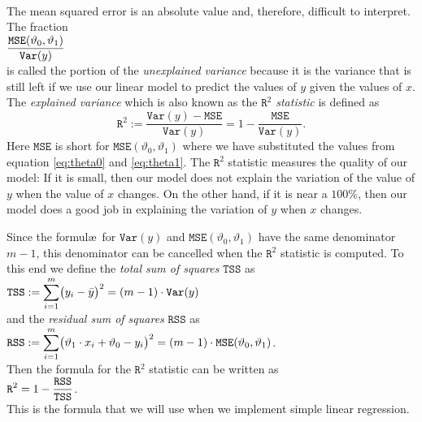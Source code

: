 \\[0.2cm]
The mean squared error is an absolute value and, therefore, difficult to interpret.  The fraction
\\[0.2cm]
\hspace*{1.3cm}
$\displaystyle \frac{\mathtt{MSE}(\vartheta_0, \vartheta_1)}{\mathtt{Var}(y)}$
\\[0.2cm]
is called the portion of the \emph{\color{blue}unexplained variance} because it is the variance that is still
left if we use our linear model to predict the values of $y$ given the values of $x$.  The
\emph{\color{blue}explained variance} which is also known as the \emph{\color{blue}$\mathtt{R}^2$ statistic} is defined as 
\begin{equation}
  \label{eq:Rsquare}
  \mathtt{R}^2 := \frac{\mathtt{Var}(y) - \mathtt{MSE}}{\mathtt{Var}(y)} = 1 - \frac{\mathtt{MSE}}{\mathtt{Var}(y)}.
\end{equation}
Here $\mathtt{MSE}$ is short for $\mathtt{MSE}(\vartheta_0, \vartheta_1)$ where we have substituted the values
from equation \ref{eq:theta0} and \ref{eq:theta1}.  The $\mathtt{R}^2$ statistic measures the quality of our
model: If it is small, then our model does not explain the variation of the value of $y$ when the value of $x$
changes.  On the other hand, if it is near a $100\%$, then our model does a good job in explaining the 
variation of $y$ when $x$ changes.

Since the formul\ae\ for $\mathtt{Var}(y)$ and $\mathtt{MSE}(\vartheta_0, \vartheta_1)$ have the same
denominator $m-1$, this denominator can be cancelled when the $\mathtt{R}^2$ statistic is computed.  To this
end we define the \emph{\color{blue}total sum of squares} $\mathtt{TSS}$ as
\\[0.2cm]
\hspace*{1.3cm}
$\displaystyle\mathtt{TSS} := \sum\limits_{i=1}^m \bigl(y_i - \bar{y}\bigr)^2 = (m-1) \cdot \mathtt{Var}(y)$
\\[0.2cm]
and the \emph{\color{blue}residual sum of squares} $\mathtt{RSS}$ as
\\[0.2cm]
\hspace*{1.3cm}
$\displaystyle\mathtt{RSS} := \sum\limits_{i=1}^m \bigl(\vartheta_1 \cdot x_i + \vartheta_0 - y_i\bigr)^2
                  = (m-1) \cdot \mathtt{MSE}(\vartheta_0, \vartheta_1)
$.
\\[0.2cm]
Then the formula for the $\mathtt{R}^2$ statistic can be written as
\\[0.2cm]
\hspace*{1.3cm}
$\displaystyle \mathtt{R}^2 = 1 - \frac{\mathtt{RSS}}{\mathtt{TSS}}$.
\\[0.2cm]
This is the formula that we will use when we implement simple linear regression.

